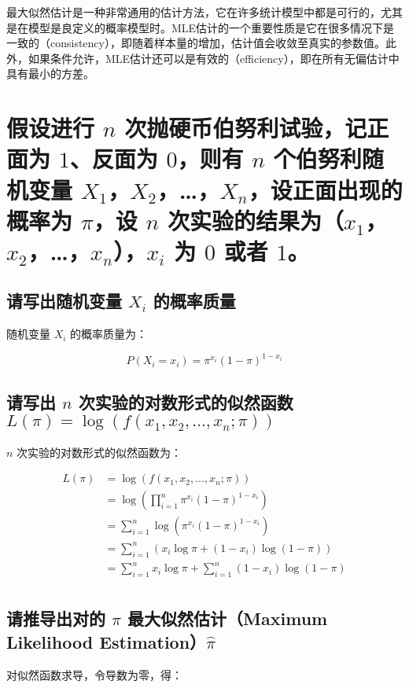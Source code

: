 \documentclass[]{article}
\begin{document}
最大似然估计是一种非常通用的估计方法，它在许多统计模型中都是可行的，尤其是在模型是良定义的概率模型时。MLE估计的一个重要性质是它在很多情况下是一致的（consistency），即随着样本量的增加，估计值会收敛至真实的参数值。此外，如果条件允许，MLE估计还可以是有效的（efficiency），即在所有无偏估计中具有最小的方差。

\section{假设进行 $n$ 次抛硬币伯努利试验，记正面为 $1$、反面为 $0$，则有 $n$ 个伯努利随机变量 $X_1$，$X_2$，…，$X_n$，设正面出现的概率为 $\pi$，设 $n$ 次实验的结果为（$x_1$，$x_2$，…，$x_n$），$x_i$ 为 $0$ 或者 $1$。}

\subsection{请写出随机变量 $X_i$ 的概率质量}

随机变量 $X_i$ 的概率质量为：

$$P(X_i=x_i)=\pi^{x_i}(1-\pi)^{1-x_i}$$

\subsection{请写出 $n$ 次实验的对数形式的似然函数 $L(\pi)=\log(f(x_1,x_2,...,x_n;\pi))$ }

$n$ 次实验的对数形式的似然函数为：

\begin{equation}
    \begin{aligned}
        L(\pi)
        &=\log(f(x_1,x_2,...,x_n;\pi))\\
        &=\log(\prod_{i=1}^n\pi^{x_i}(1-\pi)^{1-x_i})\\
        &=\sum_{i=1}^n\log(\pi^{x_i}(1-\pi)^{1-x_i})\\
        &=\sum_{i=1}^n(x_i\log\pi+(1-x_i)\log(1-\pi))\\
        &=\sum_{i=1}^nx_i\log\pi+\sum_{i=1}^n(1-x_i)\log(1-\pi)\\
    \end{aligned}
\end{equation}

\subsection{请推导出对的 $\pi$ 最大似然估计（Maximum Likelihood Estimation）$\hat{\pi}$ }

对似然函数求导，令导数为零，得：
\end{document}
